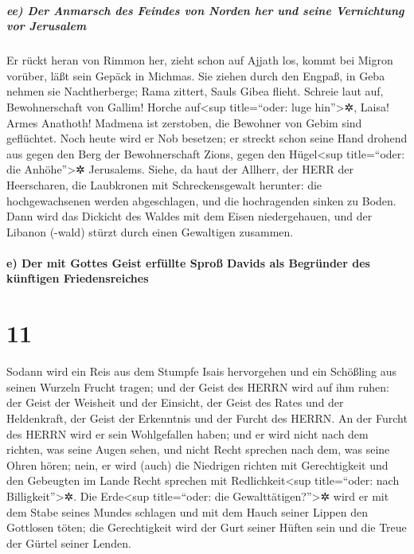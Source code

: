 \hypertarget{ee-der-anmarsch-des-feindes-von-norden-her-und-seine-vernichtung-vor-jerusalem}{%
\subparagraph{ee) Der Anmarsch des Feindes von Norden her und seine
Vernichtung vor
Jerusalem}\label{ee-der-anmarsch-des-feindes-von-norden-her-und-seine-vernichtung-vor-jerusalem}}

Er rückt heran von Rimmon her, zieht schon auf Ajjath
los, kommt bei Migron vorüber, läßt sein Gepäck in Michmas.
Sie ziehen durch den Engpaß, in Geba nehmen sie
Nachtherberge; Rama zittert, Sauls Gibea flieht. Schreie
laut auf, Bewohnerschaft von Gallim! Horche auf\textless sup
title=``oder: luge hin''\textgreater✲, Laisa! Armes Anathoth!
Madmena ist zerstoben, die Bewohner von Gebim sind
geflüchtet. Noch heute wird er Nob besetzen; er streckt
schon seine Hand drohend aus gegen den Berg der Bewohnerschaft Zions,
gegen den Hügel\textless sup title=``oder: die Anhöhe''\textgreater✲
Jerusalems. Siehe, da haut der Allherr, der HERR der
Heerscharen, die Laubkronen mit Schreckensgewalt herunter: die
hochgewachsenen werden abgeschlagen, und die hochragenden sinken zu
Boden. Dann wird das Dickicht des Waldes mit dem Eisen
niedergehauen, und der Libanon (-wald) stürzt durch einen Gewaltigen
zusammen.

\hypertarget{e-der-mit-gottes-geist-erfuxfcllte-sprouxdf-davids-als-begruxfcnder-des-kuxfcnftigen-friedensreiches}{%
\paragraph{e) Der mit Gottes Geist erfüllte Sproß Davids als Begründer
des künftigen
Friedensreiches}\label{e-der-mit-gottes-geist-erfuxfcllte-sprouxdf-davids-als-begruxfcnder-des-kuxfcnftigen-friedensreiches}}

\hypertarget{section-10}{%
\section{11}\label{section-10}}

Sodann wird ein Reis aus dem Stumpfe Isais hervorgehen und
ein Schößling aus seinen Wurzeln Frucht tragen; und der
Geist des HERRN wird auf ihm ruhen: der Geist der Weisheit und der
Einsicht, der Geist des Rates und der Heldenkraft, der Geist der
Erkenntnis und der Furcht des HERRN. An der Furcht des
HERRN wird er sein Wohlgefallen haben; und er wird nicht nach dem
richten, was seine Augen sehen, und nicht Recht sprechen nach dem, was
seine Ohren hören; nein, er wird (auch) die Niedrigen
richten mit Gerechtigkeit und den Gebeugten im Lande Recht sprechen mit
Redlichkeit\textless sup title=``oder: nach Billigkeit''\textgreater✲.
Die Erde\textless sup title=``oder: die Gewalttätigen?''\textgreater✲
wird er mit dem Stabe seines Mundes schlagen und mit dem Hauch seiner
Lippen den Gottlosen töten; die Gerechtigkeit wird der
Gurt seiner Hüften sein und die Treue der Gürtel seiner Lenden.

